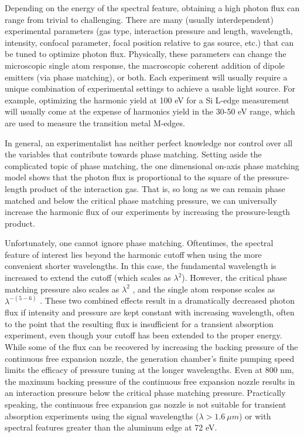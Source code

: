 Depending on the energy of the spectral feature, obtaining a high photon flux can range from trivial to challenging. There are many (usually interdependent) experimental parameters (gas type, interaction pressure and length, wavelength, intensity, confocal parameter, focal position relative to gas source, etc.) that can be tuned to optimize photon flux. Physically, these parameters can change the microscopic single atom response, the macroscopic coherent addition of dipole emitters (via phase matching), or both. Each experiment will usually require a unique combination of experimental settings to achieve a usable light source. For example, optimizing the harmonic yield at 100 eV for a Si L-edge measurement will usually come at the expense of harmonics yield in the 30-50 eV range, which are used to measure the transition metal M-edges.

In general, an experimentalist has neither perfect knowledge nor control over all the variables that contribute towards phase matching. Setting aside the complicated topic of phase matching, the one dimensional on-axis phase matching model\cite{constantOptimizingHighHarmonic1999} shows that the photon flux is proportional to the square of the pressure-length product of the interaction gas. That is, so long as we can remain phase matched and below the critical phase matching pressure\cite{popmintchevPhaseMatchingHigh2009}, we can universally increase the harmonic flux of our experiments by increasing the pressure-length product.

Unfortunately, one cannot ignore phase matching. Oftentimes, the spectral feature of interest lies beyond the harmonic cutoff when using the more convenient shorter wavelengths. In this case, the fundamental wavelength is increased to extend the cutoff (which scales as $\lambda^2$). However, the critical phase matching pressure also scales as $\lambda^2$ \cite{popmintchevPhaseMatchingHigh2009}, and the single atom response scales as $\lambda^{-(5-6)}$ \cite{tateScalingWavePacketDynamics2007}. These two combined effects result in a dramatically decreased photon flux if intensity and pressure are kept constant with increasing wavelength, often to the point that the resulting flux is insufficient for a transient absorption experiment, even though your cutoff has been extended to the proper energy. While some of the flux can be recovered by increasing the backing pressure of the continuous free expansion nozzle, the generation chamber's finite pumping speed limits the efficacy of pressure tuning at the longer wavelengths. Even at 800 nm, the maximum backing pressure of the continuous free expansion nozzle results in an interaction pressure below the critical phase matching pressure. Practically speaking, the continuous free expansion gas nozzle is not suitable for transient absorption experiments using the signal wavelengths ($\lambda > 1.6 \ \mu m$) or with spectral features greater than the aluminum edge at 72 eV.


